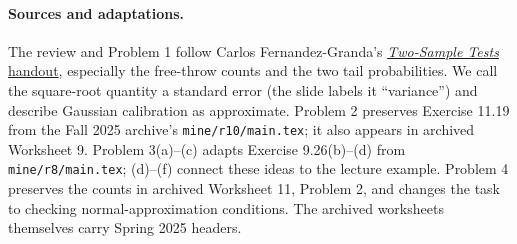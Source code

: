 \documentclass[11pt]{article}
\begin{document}
\paragraph{Sources and adaptations.}
The review and Problem 1 follow Carlos Fernandez-Granda's
\href{https://github.com/cfgranda/ps4ds/blob/main/slides/hypothesis\%20testing/two_sample_tests_handout.pdf}{\emph{Two-Sample Tests} handout},
especially the free-throw counts and the two tail probabilities.
We call the square-root quantity a standard error (the slide labels it
``variance'') and describe Gaussian calibration as approximate.
Problem 2 preserves Exercise 11.19 from the Fall 2025 archive's
\texttt{mine/r10/main.tex}; it also appears in archived Worksheet 9.
Problem 3(a)--(c) adapts Exercise 9.26(b)--(d) from
\texttt{mine/r8/main.tex}; (d)--(f) connect these ideas to the lecture example.
Problem 4 preserves the counts in archived Worksheet 11, Problem 2,
and changes the task to checking normal-approximation conditions.
The archived worksheets themselves carry Spring 2025 headers.
\fi
\end{document}
